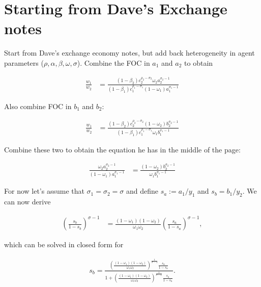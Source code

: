 \documentclass[19pt]{article}
\begin{document}
\clearpage
\section{Starting from Dave's Exchange notes} \label{sec:StartingfromDavesExchangenotes}

Start from Dave's exchange economy notes, but add back heterogeneity in agent parameters ($\rho, \alpha, \beta, \omega, \sigma$). Combine the FOC in $a_1$ and $a_2$ to obtain

\begin{align} \label{eq:FOC_a1_a2}
  \frac{w_1}{w_2} &= \frac{(1 - \beta_2) c_2^{\rho_2 - \sigma_2} \omega_2 a_2^{\sigma_2 - 1}}{(1 - \beta_1) c_1^{\rho_1 - \sigma_1} (1-\omega_1) a_1^{\sigma_1 - 1}}
\end{align}

Also combine FOC in $b_1$ and $b_2$:

\begin{align} \label{eq:FOC_b1_b2}
  \frac{w_1}{w_2} &= \frac{(1 - \beta_2) c_2^{\rho_2 - \sigma_2} (1-\omega_2) b_2^{\sigma_2 - 1}}{(1 - \beta_1) c_1^{\rho_1 - \sigma_1} \omega_1 b_1^{\sigma_1 - 1}}
\end{align}


Combine these two to obtain the equation he has in the middle of the page:

\begin{align*}
  \frac{\omega_2 a_2^{\sigma_2 - 1}}{(1 - \omega_1) a_1^{\sigma_1 - 1}} &= \frac{(1-\omega_2) b_2^{\sigma_2 - 1}}{\omega_1 b_1^{\sigma_1 - 1}}
\end{align*}

For now let's assume that $\sigma_1 = \sigma_2 = \sigma$ and define $s_a := a_1/y_1$ and $s_b = b_1/y_2$. We can now derive

\begin{align*}
  \left( \frac{s_b}{1 - s_b} \right)^{\sigma - 1} &= \frac{(1-\omega_1)(1-\omega_2)}{\omega_1 \omega_2} \left( \frac{s_a}{1 - s_a} \right)^{\sigma-1},
\end{align*}

which can be solved in closed form for

\begin{align} \label{eq:soln_sb}
  s_b = \frac{\left( \frac{(1-\omega_1)(1-\omega_2)}{\omega_1 \omega_2} \right)^{\frac{1}{\sigma - 1}} \frac{s_a}{1 - s_a}}{1 + \left( \frac{(1-\omega_1)(1-\omega_2)}{\omega_1 \omega_2} \right)^{\frac{1}{\sigma - 1}} \frac{s_a}{1 - s_a}}.
\end{align}
\end{document}
